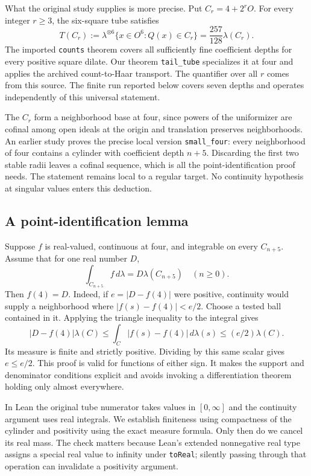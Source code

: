 \documentclass[12pt,letterpaper]{article}
\newcommand{\id}[1]{{\small\nolinkurl{#1}}}
\begin{document}
What the original study supplies is more precise. Put $C_r=4+2^r O$. For every integer $r\ge3$, the six-square tube satisfies
\[
 T(C_r):=\lambda^{\otimes6}\{x\in O^6:Q(x)\in C_r\}
          =\frac{257}{128}\lambda(C_r).
\]
The imported \id{counts} theorem covers all sufficiently fine coefficient depths for every positive square dilate. Our theorem \id{tail_tube} specializes it at four and applies the archived count-to-Haar transport. The quantifier over all $r$ comes from this source. The finite run reported below covers seven depths and operates independently of this universal statement.

The $C_r$ form a neighborhood base at four, since powers of the uniformizer are cofinal among open ideals at the origin and translation preserves neighborhoods. An earlier study proves the precise local version \id{small_four}: every neighborhood of four contains a cylinder with coefficient depth $n+5$. Discarding the first two stable radii leaves a cofinal sequence, which is all the point-identification proof needs. The statement remains local to a regular target. No continuity hypothesis at singular values enters this deduction.

\subsection{A point-identification lemma}
Suppose $f$ is real-valued, continuous at four, and integrable on every $C_{n+5}$. Assume that for one real number $D$,
\[
                    \int_{C_{n+5}}f\,d\lambda = D\lambda(C_{n+5})
                        \quad(n\ge0).
\]
Then $f(4)=D$. Indeed, if $e=|D-f(4)|$ were positive, continuity would supply a neighborhood where $|f(s)-f(4)|<e/2$. Choose a tested ball contained in it. Applying the triangle inequality to the integral gives
\[
 |D-f(4)|\lambda(C)\le \int_C |f(s)-f(4)|\,d\lambda(s)
                    \le (e/2)\lambda(C).
\]
Its measure is finite and strictly positive. Dividing by this same scalar gives $e\le e/2$. This proof is valid for functions of either sign. It makes the support and denominator conditions explicit and avoids invoking a differentiation theorem holding only almost everywhere.

In Lean the original tube numerator takes values in $[0,\infty]$ and the continuity argument uses real integrals. We establish finiteness using compactness of the cylinder and positivity using the exact measure formula. Only then do we cancel its real mass. The check matters because Lean's extended nonnegative real type assigns a special real value to infinity under \id{toReal}; silently passing through that operation can invalidate a positivity argument.
\end{document}
